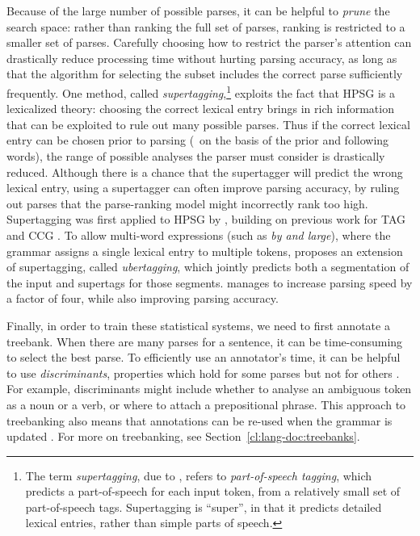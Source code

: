 \documentclass[output=paper,nonflat]{langsci/langscibook}
\begin{document}
Because of the large number of possible parses,
it can be helpful to \textit{prune} the search space:
rather than ranking the full set of parses,
ranking is restricted to a smaller set of parses.
Carefully choosing how to restrict the parser's attention 
can drastically reduce processing time without hurting parsing accuracy,
as long as that the algorithm for selecting the subset
includes the correct parse sufficiently frequently.
One method, called \textit{supertagging},\footnote{%
	The term \textit{supertagging}, due to \citet{bangalore1999supertag},
	refers to \textit{part-of-speech tagging},
	which predicts a part-of-speech for each input token,
	from a relatively small set of part-of-speech tags.
	Supertagging is ``super'', in that it predicts detailed lexical entries,
	rather than simple parts of speech.
}
exploits the fact that HPSG is a lexicalized theory:
choosing the correct lexical entry brings in rich information
that can be exploited to rule out many possible parses.
Thus if the correct lexical entry can be chosen prior to parsing
(\eg\ on the basis of the prior and following words),
the range of possible analyses the parser must consider is drastically reduced.
Although there is a chance that the supertagger will predict the wrong lexical entry,
using a supertagger can often improve parsing accuracy,
by ruling out parses that the parse-ranking model might incorrectly rank too high.
Supertagging was first applied to HPSG by \citet{matsuzaki2007supertag},
building on previous work for TAG \citep{bangalore1999supertag}
and CCG \citep{clark2004supertag}.
To allow multi-word expressions (such as \textit{by and large}),
where the grammar assigns a single lexical entry to multiple tokens,
\citet{dridan2013ubertag} proposes an extension of supertagging, called \textit{ubertagging},
which jointly predicts both a segmentation of the input and supertags for those segments.
\citeauthor{dridan2013ubertag} manages to increase parsing speed by a factor of four,
while also improving parsing accuracy.


Finally, in order to train these statistical systems,
we need to first annotate a treebank.
When there are many parses for a sentence,
it can be time-consuming to select the best parse.
To efficiently use an annotator's time,
it can be helpful to use \textit{discriminants},
properties which hold for some parses but not for others \citep{Carter:97}.
For example, discriminants might include
whether to analyse an ambiguous token as a noun or a verb,
or where to attach a prepositional phrase.
This approach to treebanking also means that
annotations can be re-used when the grammar is updated
\citep{OFTM2004a-u,Fli:Oep:Ben:17}. For more on treebanking, see Section~\ref{cl:lang-doc:treebanks}.
\end{document}
